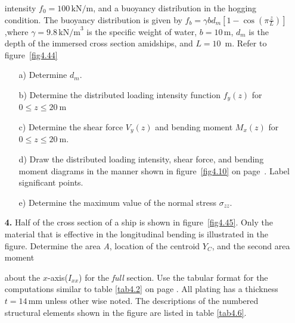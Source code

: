 \documentclass{AeroStructure-ERJohnson}
\begin{document}
\begin{exercise}
\begin{enumerate}[\textbf{2.}]
\noindent intensity $f_{0}=100\,\textrm{kN}/\textrm{m}$, and a buoyancy distribution in the hogging condition. The buoyancy distribution is given by $f_{b}=\gamma b d_{m}\left[1-\cos \left(\pi \frac{z}{L}\right)\right]$,where $\gamma = 9.8\,\textrm{kN/m}^3$ is the specific weight of water, $b=10$\,m, $d_{m}$ is the depth of the immersed cross section amidships, and $L=10$~m. Refer to figure~\ref{fig4.44}
\begin{enumerate}[b)]
  \item[a)] Determine $d_{m}$.
  \item[b)] Determine the distributed loading intensity function $f_{y}(z)$ for $0 \leq z \leq 20~\mathrm{m}$
  \item[c)] Determine the shear force $V_{y}(z)$ and bending moment $M_{x}(z)$ for $0 \leq z \leq 20~\mathrm{m}$.
  \item[d)] Draw the distributed loading intensity, shear force, and bending moment diagrams in the manner shown\break\hspace*{21pt} in figure~\ref{fig4.10} on page~\pageref{fig4.10}. Label significant points.
  \item[e)] Determine the maximum value of the normal stress $\sigma_{z z}$.
\end{enumerate}

\item[\textbf{4.}]  Half of the cross section of a ship is shown in figure~\ref{fig4.45}. Only the material that is effective in the longitudinal bending is illustrated in the figure. Determine the area \textit{A}, location of the centroid $Y_{C}$, and the second area moment{\parfillskip=0pt\par}

\clearpage

\noindent about the $x$-axis($I_{x x}$) for the \textit{full} section. Use the tabular format for the computations similar to table \ref{tab4.2} on page \pageref{tab4.2}. All plating has a thickness $t = 14$\,mm unless other wise noted. The descriptions of the numbered structural elements shown in the figure are listed in table \ref{tab4.6}.


\end{enumerate}
\end{exercise}
\end{document}
